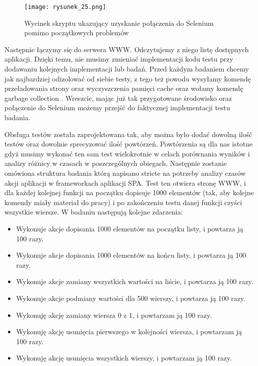 \begin{figure}[htbp]
    \centering
    \texttt{[image: rysunek\_25.png]}
    \caption{Wycinek skryptu ukazujący uzyskanie połączenia do Selenium pomimo początkowych problemów}
    \label{fig:rysunek_25}
\end{figure}

Następnie łączymy się do serwera WWW. Odczytujemy z niego listę dostępnych aplikacji.
Dzięki temu, nie musimy zmieniać implementacji kodu testu przy dodawaniu kolejnych implementacji lub badań.
Przed każdym badaniem chcemy jak najbardziej odizolować od siebie testy, z tego też powodu wysyłamy komendę przeładowania strony oraz wyczyszczenia pamięci cache
oraz wołamy komendę garbage collection \cite{mozilla-memory}.
Wreszcie, mając już tak przygotowane środowisko oraz połączenie do Selenium możemy przejść do faktycznej implementacji testu badania.

Obsługa testów została zaprojektowana tak, aby można było dodać dowolną ilość testów oraz dowolnie sprecyzować ilość powtórzeń.
Powtórzenia są dla nas istotne gdyż musimy wykonać ten sam test wielokrotnie w celach porównania wyników i analizy różnicy w czasach w poszczególnych obiegach.
Następnie zostanie omówiona struktura badania którą napisano stricte na potrzeby analizy czasów akcji aplikacji w frameworkach aplikacji SPA.
Test ten otwiera stronę WWW, i dla każdej kolejnej funkcji na początku dopisuje 1000 elementów (tak, aby kolejne komendy miały materiał do pracy)
i po zakończeniu testu danej funkcji czyści wszystkie wiersze. W badaniu następują kolejne zdarzenia:

\begin{itemize}
    \item Wykonuje akcje dopisania 1000 elementów na początku listy, i powtarza ją 100 razy.
    \item Wykonuje akcje dopisania 1000 elementów na końcu listy, i powtarza ją 100 razy.
    \item Wykonuje akcje zamiany wszystkich wartości na liście, i powtarza ją 100 razy.
    \item Wykonuje akcje podmiany wartości dla 500 wierszy, i powtarza ją 100 razy.
    \item Wykonuję akcję zamiany wiersza 0 z 1, i powtarzam ją 100 razy.
    \item Wykonuję akcję usunięcia pierwszego w kolejności wiersza, i powtarzam ją 100 razy.
    \item Wykonuję akcję usunięcia wszystkich wierszy, i powtarzam ją 100 razy.
\end{itemize}

